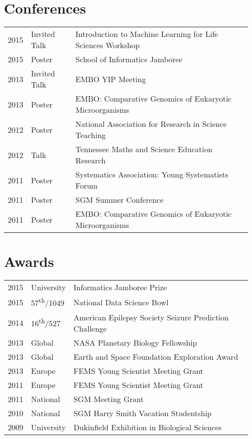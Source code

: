 \documentclass[]{Finlay_Maguire_CV}
\begin{document}
\begin{minipage}[t]{0.66\textwidth}

\section{Conferences}

\begin{tabular}{rll}
2015 & Invited Talk &  Introduction to Machine Learning for Life Sciences Workshop\\
2015 & Poster & School of Informatics Jamboree\\
2013 & Invited Talk & EMBO YIP Meeting \\
2013 & Poster & EMBO: Comparative Genomics of Eukaryotic Microorganisms\\
2012 & Poster & National Association for Research in Science Teaching\\
2012 & Talk & Tennessee Maths and Science Education Research\\
2011 & Poster & Systematics Association: Young Systematists Forum\\
2011 & Poster & SGM Summer Conference\\
2011 & Poster & EMBO: Comparative Genomics of Eukaryotic Microorganisms\\
\end{tabular}
\sectionsep

\vspace{-0.5cm}

\section{Awards} 
\begin{tabular}{rll}
2015	     & University  & Informatics Jamboree Prize \\
2015         & 57\textsuperscript{th}/1049 & National Data Science Bowl\\
2014         & 16\textsuperscript{th}/527 & American Epilepsy Society Seizure Prediction Challenge \\
2013	     & Global & NASA Planetary Biology Fellowship \\
2013	     & Global & Earth and Space Foundation Exploration Award\\
2013     & Europe & FEMS Young Scientist Meeting Grant \\
2011     & Europe & FEMS Young Scientist Meeting Grant \\
2011     & National & SGM Meeting Grant\\
2010     & National & SGM Harry Smith Vacation Studentship\\
2009     & University & Dukinfield Exhibition in Biological Sciences\\
\end{tabular}
\sectionsep


\end{minipage}
\end{document}
